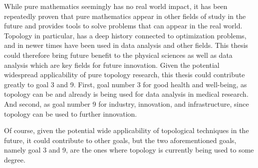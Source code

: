 While pure mathematics seemingly has no real world impact, it has been repeatedly proven that pure mathematics appear in other fields of study in the future and provides tools to solve problems that can appear in the real world. Topology in particular, has a deep history connected to optimization problems, and in newer times have been used in data analysis and other fields. This thesis could therefore bring future benefit to the physical sciences as well as data analysis which are key fields for future innovation. Given the potential widespread applicability of pure topology research, this thesis could contribute greatly to goal 3 and 9. First, goal number 3 for good health and well-being, as topology can be and already is being used for data analysis in medical research. And second, as goal number 9 for industry, innovation, and infrastructure, since topology can be used to further innovation.

Of course, given the potential wide applicability of topological techniques in the future, it could contribute to other goals, but the two aforementioned goals, namely goal 3 and 9, are the ones where topology is currently being used to some degree.
